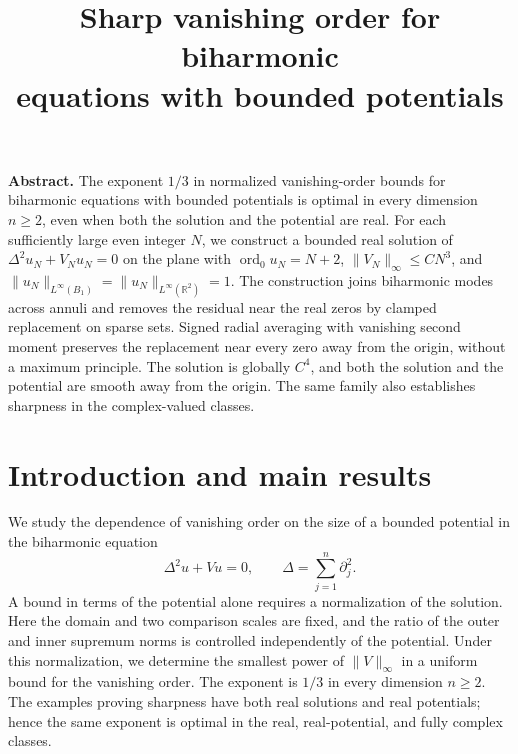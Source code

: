 \documentclass[11pt,twoside,leqno]{article}
\title{Sharp vanishing order for biharmonic\\
equations with bounded potentials}
\author{}
\date{}
\numberwithin{equation}{section}
\theoremstyle{definition}
\theoremstyle{remark}
\newcommand{\R}{\mathbb R}
\newcommand{\ord}{\operatorname{ord}}
\begin{document}
\maketitle
\begingroup
\renewcommand{\thefootnote}{}
\endgroup
\begin{center}
\begin{minipage}{11.5cm}\small
\noindent\textbf{Abstract.}
The exponent $1/3$ in normalized vanishing-order bounds for biharmonic
equations with bounded potentials is optimal in every dimension $n\ge2$,
even when both the solution and the potential are real. For each
sufficiently large even integer $N$, we construct a
bounded real solution of $\Delta^2u_N+V_Nu_N=0$ on the plane with
$\ord_0u_N=N+2$, $\|V_N\|_\infty\le CN^3$, and
$\|u_N\|_{L^\infty(B_1)}=\|u_N\|_{L^\infty(\R^2)}=1$.
The construction joins biharmonic modes across annuli and removes the
residual near the real zeros by clamped replacement on sparse sets.
Signed radial averaging with vanishing second moment preserves the
replacement near every zero away from the origin, without a maximum
principle.
The solution is globally $C^4$, and both the solution and the potential
are smooth away from the origin. The same family also establishes
sharpness in the complex-valued classes.
\end{minipage}
\end{center}
\medskip
\tableofcontents
\clearpage

\section{Introduction and main results}\label{sec:introduction}

We study the dependence of vanishing order on the size of a bounded
potential in the biharmonic equation
\begin{equation}\label{eq:equation}
 \Delta^2u+Vu=0,
 \qquad \Delta=\sum_{j=1}^n\partial_j^2.
\end{equation}
A bound in terms of the potential alone requires a normalization of the
solution. Here the domain and two comparison scales are fixed, and the
ratio of the outer and inner supremum norms is controlled independently
of the potential. Under this normalization, we determine the smallest
power of $\|V\|_\infty$ in a uniform bound for the vanishing order.
The exponent is $1/3$ in every dimension $n\ge2$. The examples proving
sharpness have both real solutions and real potentials; hence the same
exponent is optimal in the real, real-potential, and fully complex
classes.
\end{document}
